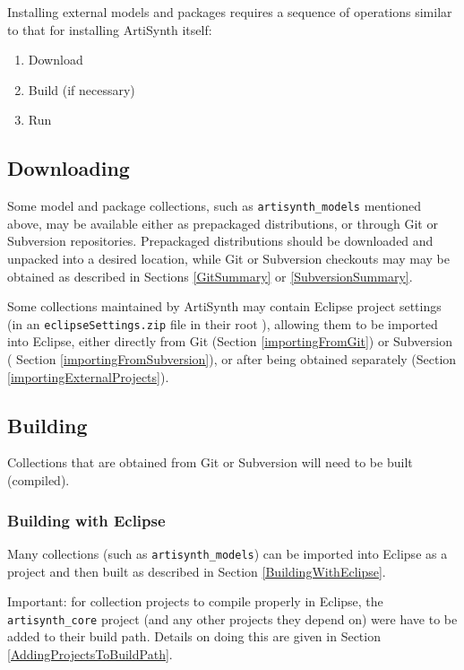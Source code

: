 Installing external models and packages requires a sequence of
operations similar to that for installing ArtiSynth itself:

\begin{enumerate}

\item Download

\item Build (if necessary)

\item Run

\end{enumerate}

\subsection{Downloading}

Some model and package collections, such as {\tt artisynth\_models}
mentioned above, may be available either as prepackaged distributions,
or through Git or Subversion repositories.  Prepackaged distributions
should be downloaded and unpacked into a desired location, while Git
or Subversion checkouts may may be obtained as described in
Sections \ref{GitSummary} or \ref{SubversionSummary}.

Some collections maintained by ArtiSynth may contain Eclipse project
settings (in an {\tt eclipseSettings.zip} file in their root
\directory{}), allowing them to be imported into Eclipse, either
directly from Git (Section \ref{importingFromGit}) or Subversion (
Section \ref{importingFromSubversion}),
or after being obtained separately 
(Section \ref{importingExternalProjects}).

\subsection{Building}

Collections that are obtained from Git or Subversion will need to be
built (compiled).

\subsubsection{Building with Eclipse}

Many collections (such as {\tt artisynth\_models}) can be imported
into Eclipse as a project and then built as described in Section
\ref{BuildingWithEclipse}.

\begin{sideblock}
Important: for collection projects to compile properly in Eclipse, the
{\tt artisynth\_core} project (and any other projects they depend on)
were have to be added to their build path. Details on doing this are
given in Section \ref{AddingProjectsToBuildPath}.
\end{sideblock}

